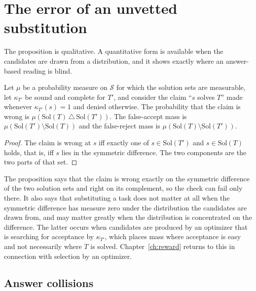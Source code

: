 \section{The error of an unvetted substitution}

The proposition is qualitative. A quantitative form is available when the candidates are drawn from a distribution, and it shows exactly where an answer-based reading is blind.

\begin{proposition}
\label{prop:subserr}
Let $\mu$ be a probability measure on $\mathcal{S}$ for which the solution sets are measurable, let $\kappa_{T'}$ be sound and complete for $T'$, and consider the claim ``$s$ solves $T$'' made whenever $\kappa_{T'}(s)=1$ and denied otherwise. The probability that the claim is wrong is $\mu(\mathrm{Sol}(T)\,\triangle\,\mathrm{Sol}(T'))$. The false-accept mass is $\mu(\mathrm{Sol}(T')\setminus\mathrm{Sol}(T))$ and the false-reject mass is $\mu(\mathrm{Sol}(T)\setminus\mathrm{Sol}(T'))$.
\end{proposition}

\begin{proof}
The claim is wrong at $s$ iff exactly one of $s\in \mathrm{Sol}(T')$ and $s\in \mathrm{Sol}(T)$ holds, that is, iff $s$ lies in the symmetric difference. The two components are the two parts of that set.
\end{proof}

The proposition says that the claim is wrong exactly on the symmetric difference of the two solution sets and right on its complement, so the check can fail only there. It also says that substituting a task does not matter at all when the symmetric difference has measure zero under the distribution the candidates are drawn from, and may matter greatly when the distribution is concentrated on the difference. The latter occurs when candidates are produced by an optimizer that is searching for acceptance by $\kappa_{T'}$, which places mass where acceptance is easy and not necessarily where $T$ is solved. Chapter~\ref{ch:reward} returns to this in connection with selection by an optimizer.

\subsection*{Answer collisions}

